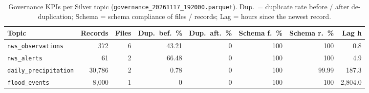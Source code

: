 \begin{table}[H]\centering\scriptsize
\caption{Governance KPIs per Silver topic (\texttt{governance\_20261117\_192000.parquet}). Dup.\ = duplicate rate before / after de-duplication; Schema = schema compliance of files / records; Lag = hours since the newest record.}\label{tab:govtopic}
\begin{tabular}{@{}lrrrrrrr@{}}\toprule
Topic & Records & Files & Dup.\ bef.\ \% & Dup.\ aft.\ \% & Schema f.\ \% & Schema r.\ \% & Lag h\\\midrule
\texttt{nws\_observations} & 372 & 6 & 43.21 & 0 & 100 & 100 & 0.8\\
\texttt{nws\_alerts} & 61 & 2 & 66.48 & 0 & 100 & 100 & 4.9\\
\texttt{daily\_precipitation} & 30,786 & 2 & 0.78 & 0 & 100 & 99.99 & 187.3\\
\texttt{flood\_events} & 8,000 & 1 & 0 & 0 & 100 & 100 & 2,804.0\\
\bottomrule\end{tabular}\end{table}